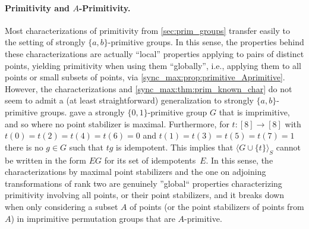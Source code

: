 \paragraph{Primitivity and $A$-Primitivity.}
Most characterizations of primitivity
from \cref{sec:prim_groups}
transfer easily to the setting of strongly $\{a,b\}$-primitive
groups. In this sense, the properties behind these characterizations
are actually ``local'' properties applying to pairs
of distinct points, yielding primitivity when using them ``globally'', i.e.,
applying them to all points or small subsets of points,
via \cref{sync_max:prop:primitive_Aprimitive}.
However, the characterizations
and \cref{sync_max:thm:prim_known_char}
do not seem to admit a (at least straightforward) generalization
to strongly $\{a,b\}$-primitive groups.
gave a strongly $\{0,1\}$-primitive group $G$
that is imprimitive, and so where no 
point stabilizer is maximal.
Furthermore, for $t \colon [8] \to [8]$
with $t(0) = t(2) = t(4) = t(6) = 0$
and $t(1) = t(3) = t(5) = t(7) = 1$
there is no $g \in G$
such that $tg$ is idempotent.
This implies that $\langle G \cup \{t\} \rangle_S$
cannot be written in the form $EG$
for its set of idempotents~$E$.
In this sense, the characterizations by maximal point stabilizers
and the one on adjoining transformations of rank two
are genuinely ''global`` properties characterizing primitivity
involving all points, or their point stabilizers,
and it breaks down when only
considering a subset $A$ of points (or the point stabilizers of points from $A$)
in imprimitive permutation groups that are $A$-primitive. 




